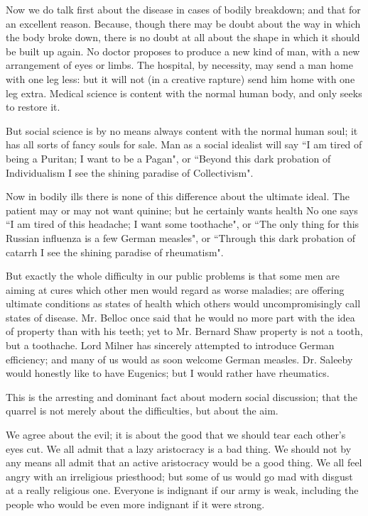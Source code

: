 \documentclass[final,10pt,letterpaper,twocolumn,openany]{book}
\begin{document}
Now we do talk first about the disease in cases of bodily breakdown;
and that for an excellent reason. Because, though there may be doubt
about the way in which the body broke down, there is no doubt at all about
the shape in which it should be built up again. No doctor proposes to
produce a new kind of man, with a new arrangement of eyes or limbs. The
hospital, by necessity, may send a man home with one leg less: but it will
not (in a creative rapture) send him home with one leg extra. Medical
science is content with the normal human body, and only seeks to restore
it.

But social science is by no means always content with the normal
human soul; it has all sorts of fancy souls for sale. Man as a social idealist
will say ``I am tired of being a Puritan; I want to be a Pagan", or ``Beyond
this dark probation of Individualism I see the shining paradise of
Collectivism".

 Now in bodily ills there is none of this difference about the
ultimate ideal. The patient may or may not want quinine; but he certainly
wants health No one says ``I am tired of this headache; I want some
toothache", or ``The only thing for this Russian influenza is a few German
measles", or ``Through this dark probation of catarrh I see the shining
paradise of rheumatism". 

But exactly the whole difficulty in our public
problems is that some men are aiming at cures which other men would
regard as worse maladies; are offering ultimate conditions as states of
health which others would uncompromisingly call states of disease. Mr.
Belloc once said that he would no more part with the idea of property than
with his teeth; yet to Mr. Bernard Shaw property is not a tooth, but a
toothache. Lord Milner has sincerely attempted to introduce German
efficiency; and many of us would as soon welcome German measles. Dr.
Saleeby would honestly like to have Eugenics; but I would rather have
rheumatics.

This is the arresting and dominant fact about modern social discussion;
that the quarrel is not merely about the difficulties, but about the aim. 

We agree about the evil; it is about the good that we should tear each other's
eyes cut. We all admit that a lazy aristocracy is a bad thing. We should not
by any means all admit that an active aristocracy would be a good thing.
We all feel angry with an irreligious priesthood; but some of us would go
mad with disgust at a really religious one. Everyone is indignant if our
army is weak, including the people who would be even more indignant if
it were strong. 
\end{document}
